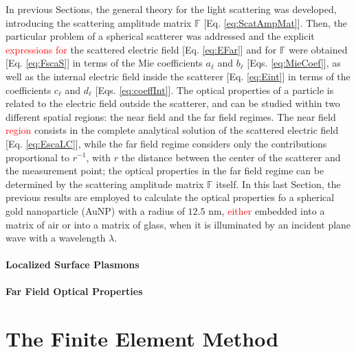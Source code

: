 \documentclass[11pt]{Latex/Classes/PhDthesisPSnPDF}
\begin{document}
         In previous Sections, the general theory for the light scattering was developed, introducing the scattering amplitude matrix $\mathbb{F}$ [Eq. \eqref{eq:ScatAmpMat}]. Then, the particular problem of a spherical scatterer was addressed and the explicit \textcolor{red}{expressions for} the scattered electric field [Eq. \eqref{eq:EFar}] and for $\mathbb{F}$ were obtained [Eq. \eqref{eq:FscaS}] in terms of the Mie coefficients $a_\ell$ and  $b_\ell$ [Eqs. \eqref{eq:MieCoef}], as well as the internal electric field inside the scatterer [Eq. \eqref{eq:Eint}] in terms of the coefficients $c_\ell$ and $d_\ell$ [Eqs. \eqref{eq:coeffInt}]. The  optical properties of a particle is related to the electric field outside the scatterer,  and can be studied within two different spatial regions: the near field and the far field regimes. The near field \textcolor{red}{region} consists in the complete analytical solution of the scattered electric field [Eq. \eqref{eq:EscaLC}], while the far field regime considers only the contributions proportional to $r^{-1}$, with $r$ the distance between the center of the scatterer and the measurement point; the optical properties in the far field regime can be determined by the scattering amplitude matrix $\mathbb{F}$ itself.  In this last Section, the previous results are employed to calculate the optical properties fo  a spherical gold nanoparticle (AuNP) with a radius of $12.5$ nm, \textcolor{red}{either} embedded into a matrix of air or into a matrix of glass, when it is illuminated by an incident plane wave with a wavelength $\lambda$.

            \subsubsection{Localized Surface Plasmons}
             \label{sss:LSPR}
             

            \subsubsection{Far Field Optical Properties}
             \label{sss:FarField}
             


\chapter{The Finite Element Method}
 \label{chapter:FEM}
\end{document}
